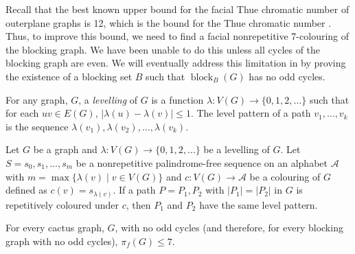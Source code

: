 \documentclass{cccg16}
\DeclareMathOperator{\block}{block}
\begin{document}
Recall that the best known upper bound for the facial Thue chromatic
number of outerplane graphs is 12, which is the bound for the Thue
chromatic number \cite{barat2007square, kundgen2008nonrepetitive}. Thus,
to improve this bound, we need to find a facial nonrepetitive 7-colouring
of the blocking graph. We have been unable to do this unless all cycles of
the blocking graph are even.  We will eventually address this limitation
in  by proving the existence of a blocking
set $B$ such that $\block_B(G)$ has no odd cycles.

For any graph, $G$, a \emph{levelling} of $G$ is a function
$\lambda\colon V(G)\to \{0, 1, 2,\dots\}$ such that for each
$uv\in E(G)$, $|\lambda(u)-\lambda(v)|\leq 1$. The
level pattern of a path $v_1,\ldots,v_k$ is the sequence
$\lambda(v_1),\lambda(v_2),\ldots,\lambda(v_k)$.

\begin{lem} 
 Let $G$ be a graph and $\lambda\colon V(G)\to \{0, 1,
 2,\dots\}$ be a levelling of $G$. Let $S=s_0,s_1,\ldots,s_m$
 be a nonrepetitive palindrome-free sequence on an alphabet
 $\mathcal{A}$ with $m=\max\{\lambda(v) \;|\; v \in V(G)\}$ and
 $c : V(G) \rightarrow \mathcal{A}$ be a colouring of $G$ defined
 as $c(v)=s_{\lambda(v)}$. If a path $P=P_1, P_2$ with
 $|P_1|=|P_2|$ in $G$ is repetitively coloured under $c$, then $P_1$
 and $P_2$ have the same level pattern.
\end{lem}

\begin{lem}
  For every cactus graph, $G$, with no odd cycles (and therefore, for
  every blocking graph with no odd cycles), $\pi_f(G)\le 7$.
\end{lem}
\end{document}

